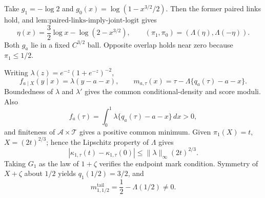 Take \(g_1=-\log2\) and \(g_0(x)=\log(1-x^{3/2}/2)\).  Then the former paired links hold, and \(\text{lem:paired-links-imply-joint-logit}\) gives
\[
 \eta(x)=\frac32\log x-\log(2-x^{3/2}),
 \qquad (\pi_1,\pi_0)=(\Lambda(\eta),\Lambda(-\eta)).
\]
Both \(g_a\) lie in a fixed \(C^{3/2}\) ball.  Opposite overlap holds near zero because \(\pi_1\le1/2\).

Writing \(\lambda(z)=e^{-z}(1+e^{-z})^{-2}\),
\[
 f_{a\mid X}(y\mid x)=\lambda(y-a-x),
 \qquad
 m_{a,\tau}(x)=\tau-\Lambda\{q_a(\tau)-a-x\}.
\]
Boundedness of \(\lambda\) and \(\lambda'\) gives the common conditional-density and score moduli.  Also
\[
 f_a(\tau)=\int_0^1\lambda\{q_a(\tau)-a-x\}\,dx>0,
\]
and finiteness of \(\mathcal A\times\mathcal T\) gives a positive common minimum.  Given \(\pi_1(X)=t\), \(X=(2t)^{2/3}\); hence the Lipschitz property of \(\Lambda\) gives
\[
 |\kappa_{1,\tau}(t)-\kappa_{1,\tau}(0)|
 \le \|\lambda\|_\infty(2t)^{2/3}.
\]
Taking \(G_1\) as the law of \(1+\zeta\) verifies the endpoint mark condition.  Symmetry of \(X+\zeta\) about \(1/2\) yields \(q_1(1/2)=3/2\), and
\[
 m^{\mathrm{tail}}_{1,1/2}=\frac12-\Lambda(1/2)\ne0.
\]

